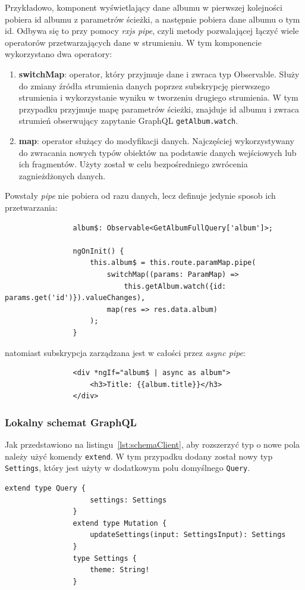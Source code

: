 			Przykładowo, komponent wyświetlający dane albumu w pierwszej kolejności pobiera id albumu z parametrów ścieżki,
			a następnie pobiera dane albumu o tym id.
			Odbywa się to przy pomocy \emph{rxjs pipe}, czyli metody pozwalającej łączyć wiele operatorów przetwarzających dane w strumieniu.
			W tym komponencie wykorzystano dwa operatory:
			\begin{enumerate}
				\item \textbf{switchMap}: operator, który przyjmuje dane i zwraca typ Observable.
					Służy do zmiany źródła strumienia danych poprzez subskrypcję pierwszego strumienia i wykorzystanie wyniku w tworzeniu drugiego strumienia.
					W tym przypadku przyjmuje mapę parametrów ścieżki, znajduje id albumu i zwraca strumień obserwujący zapytanie GraphQL \verb|getAlbum.watch|.

				\item \textbf{map}: operator służący do modyfikacji danych.
					Najczęściej wykorzystywany do zwracania nowych typów obiektów na podstawie danych wejściowych lub ich fragmentów.
					Użyty został w celu bezpośredniego zwrócenia zagnieżdżonych danych.
			\end{enumerate}
			Powstały \emph{pipe} nie pobiera od razu danych, lecz definuje jedynie sposob ich przetwarzania:
			\begin{lstlisting}
				album$: Observable<GetAlbumFullQuery['album']>;

				ngOnInit() {
					this.album$ = this.route.paramMap.pipe(
						switchMap((params: ParamMap) =>
							this.getAlbum.watch({id: params.get('id')}).valueChanges),
						map(res => res.data.album)
					);
				}
			\end{lstlisting}
			natomiast subskrypcja zarządzana jest w całości przez \emph{async pipe}:
			\begin{lstlisting}
				<div *ngIf="album$ | async as album">
					<h3>Title: {{album.title}}</h3>
				</div>
			\end{lstlisting}
			
		\subsubsection*{Lokalny schemat GraphQL}
			Jak przedstawiono na listingu~\ref{lst:schemaClient}, aby rozszerzyć typ o nowe pola należy użyć komendy \verb|extend|.
			W tym przypadku dodany został nowy typ \verb|Settings|, który jest użyty w dodatkowym polu domyślnego \verb|Query|.
			\begin{lstlisting}[label=lst:schemaClient, caption=Lokalny schemat GraphQL, float=th]
				extend type Query {
					settings: Settings
				}
				extend type Mutation {
					updateSettings(input: SettingsInput): Settings
				}
				type Settings {
					theme: String!
				}
			\end{lstlisting}
			
